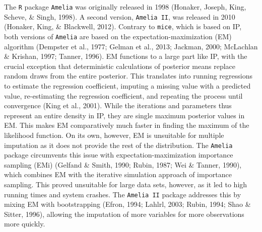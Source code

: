 \documentclass[12pt,econ]{sources/authesis}
\begin{document}
The \texttt{R} package \texttt{Amelia} was originally released in 1998 (Honaker, Joseph, King, Scheve, \& Singh, 1998). A second version, \texttt{Amelia\ II}, was released in 2010 (Honaker, King, \& Blackwell, 2012). Contrary to \texttt{mice}, which is based on IP, both versions of \texttt{Amelia} are based on the expectation-maximization (EM) algorithm (Dempster et al., 1977; Gelman et al., 2013; Jackman, 2000; McLachlan \& Krishan, 1997; Tanner, 1996). EM functions to a large part like IP, with the crucial exception that deterministic calculations of posterior means replace random draws from the entire posterior. This translates into running regressions to estimate the regression coefficient, imputing a missing value with a predicted value, re-estimating the regression coefficient, and repeating the process until convergence (King et al., 2001). While the iterations and parameters thus represent an entire density in IP, they are single maximum posterior values in EM. This makes EM comparatively much faster in finding the maximum of the likelihood function. On its own, however, EM is unsuitable for multiple imputation as it does not provide the rest of the distribution. The \texttt{Amelia} package circumvents this issue with expectation-maximization importance sampling (EMi) (Gelfand \& Smith, 1990; Rubin, 1987; Wei \& Tanner, 1990), which combines EM with the iterative simulation approach of importance sampling. This proved unsuitable for large data sets, however, as it led to high running times and system crashes. The \texttt{Amelia\ II} package addresses this by mixing EM with bootstrapping (Efron, 1994; Lahlrl, 2003; Rubin, 1994; Shao \& Sitter, 1996), allowing the imputation of more variables for more observations more quickly.
\end{document}
